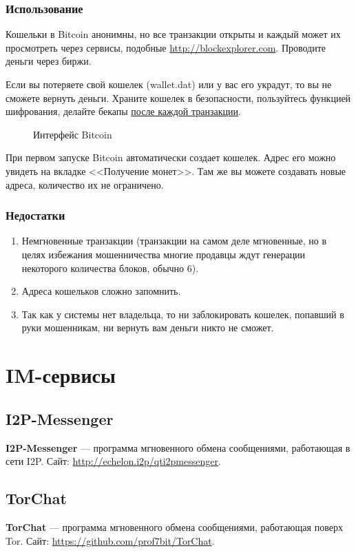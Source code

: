 \subsubsection{Использование}
\begin{important}
Кошельки в Bitcoin анонимны, но все транзакции открыты и каждый может их просмотреть через сервисы, подобные \url{http://blockexplorer.com}. Проводите деньги через биржи.
\end{important}
\begin{important}
Если вы потеряете свой кошелек (wallet.dat) или у вас его украдут, то вы не сможете вернуть деньги. Храните кошелек в безопасности, пользуйтесь функцией 
шифрования, делайте бекапы \underline{после каждой транзакции}.\end{important}
\begin{figure}[h]
\caption{Интерфейс Bitcoin}
\end{figure}
При первом запуске Bitcoin автоматически создает кошелек. Адрес его можно увидеть на вкладке <<Получение монет>>. Там же вы можете создавать новые адреса, количество их не ограничено.
\subsubsection{Недостатки}
\begin{enumerate}
\item Немгновенные транзакции (транзакции на самом деле мгновенные, но в целях избежания мошенничества многие продавцы ждут генерации некоторого количества 
блоков, 
обычно 6).
\item Адреса кошельков сложно запомнить.
\item Так как у системы нет владельца, то ни заблокировать кошелек, попавший в руки мошенникам, ни вернуть вам деньги никто не сможет.
\end{enumerate}

\section{IM-сервисы}
\subsection{I2P-Messenger}
\textbf{I2P-Messenger} --- программа мгновенного обмена сообщениями, работающая в сети I2P. Сайт: \url{http://echelon.i2p/qti2pmessenger}.
\subsection{TorChat}
\textbf{TorChat} --- программа мгновенного обмена сообщениями, работающая поверх Tor. Сайт: \url{https://github.com/prof7bit/TorChat}.
